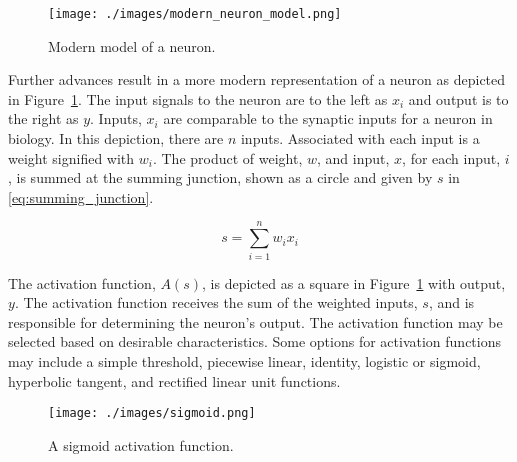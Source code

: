 \begin{figure}[h]
    \centering
    \texttt{[image: ./images/modern\_neuron\_model.png]} 
    \caption{Modern model of a neuron\cite{haykin1998neural}.}
    \label{fig:neuron_model}
\end{figure}

Further advances result in a more modern representation of a neuron as depicted
in Figure~\ref{fig:neuron_model}. The input signals to the neuron are to the left
as $x_i$ and output is to the right as $y$. Inputs, $x_i$ are comparable to the
synaptic inputs for a neuron in biology. In this depiction, there are $n$
inputs. Associated with each input is a weight signified with $w_i$. The product
of weight, $w$, and input, $x$, for each input, $i$, is summed at the summing
junction, shown as a circle and given by $s$ in \eqref{eq:summing_junction}.

\begin{equation}\label{eq:summing_junction}
    s = \sum_{i = 1}^{n} w_i x_i
\end{equation}

The activation function, $A(s)$, is depicted as a square in
Figure~\ref{fig:neuron_model} with output, $y$. The activation function receives
the sum of the weighted inputs, $s$, and is responsible for determining the
neuron's output.  The activation function may be selected based on desirable
characteristics. Some options for activation functions may include a simple
threshold, piecewise linear, identity, logistic or sigmoid, hyperbolic tangent,
and rectified linear unit functions\cite{haykin1998neural}.


\begin{figure}[H]
    \centering
    \texttt{[image: ./images/sigmoid.png]}
    \caption{A sigmoid activation function.}
    \label{fig:sigmoid}
\end{figure}


